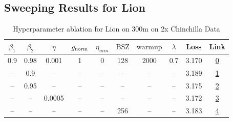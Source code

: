 \subsection{Sweeping Results for Lion}%
\begin{table}[H]
\centering
\caption{Hyperparameter ablation for Lion on 300m on 2x Chinchilla Data}
\label{tab:ablation_lion_300m_on_2x_chinchilla_data}
\begin{tabular}{cccccccccc}
\toprule
$\beta_1$ & $\beta_2$ & $\eta$ & $g_{\mathrm{norm}}$ & $\eta_{min}$ & $\mathrm{BSZ}$ & $\mathrm{warmup}$ & $\lambda$ & Loss & Link \\
\midrule
0.9 & 0.98 & 0.001 & 1 & 0 & 128 & 2000 & 0.7 & 3.170 & \href{https://wandb.ai/marin-community/optimizer-scaling/runs/sweep-300m-12B-lion5aad2alr0.001-wd0.7-minlr0-warmup2000-b10.9-b-b039e3}{0} \\
\midrule
-- & 0.9 & -- & -- & -- & -- & -- & -- & 3.189 & \href{https://wandb.ai/marin-community/optimizer-scaling/runs/sweep-300m-12B-lionb554b6lr0.001-wd0.7-minlr0-warmup2000-b10.9-b-44d68f}{1} \\
-- & 0.95 & -- & -- & -- & -- & -- & -- & 3.175 & \href{https://wandb.ai/marin-community/optimizer-scaling/runs/sweep-300m-12B-lion1d519dlr0.001-wd0.7-minlr0-warmup2000-b10.9-b-2aa8be}{2} \\
-- & -- & 0.0005 & -- & -- & -- & -- & -- & 3.172 & \href{https://wandb.ai/marin-community/optimizer-scaling/runs/sweep-300m-12B-liond0e427lr0.0005-wd0.7-minlr0-warmup2000-b10.9--07e662}{3} \\
-- & -- & -- & -- & -- & 256 & -- & -- & 3.183 & \href{https://wandb.ai/marin-community/optimizer-scaling/runs/sweep-300m-12B-lion804c87lr0.001-wd0.7-minlr0-warmup2000-b10.9-b-d99925}{4} \\
\bottomrule
\end{tabular}
\end{table}

